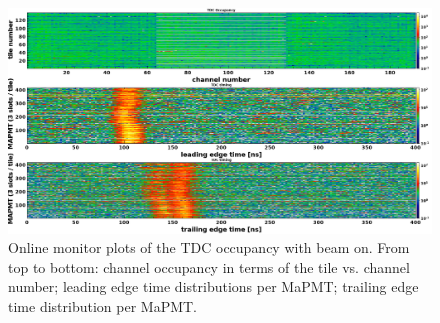 \documentclass[5p,times,twocolumn]{elsarticle}
\begin{document}
\begin{figure}[t]
\begin{center}
\includegraphics[width=1.0\columnwidth]{TDC_BeamOn.png}
\end{center}
\caption{Online monitor plots of the TDC occupancy with beam on. From top to bottom: channel occupancy in terms of the
  tile vs. channel number; leading edge time distributions per MaPMT; trailing edge time distribution per MaPMT.}
\label{fig:Online_TDC}
\end{figure}



\end{document}
